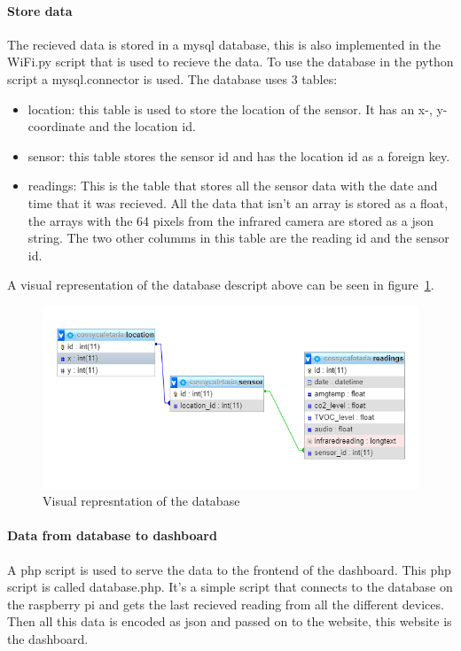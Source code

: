 \documentclass[11pt,a4paper]{article}
\begin{document}
\paragraph{Store data}
The recieved data is stored in a mysql database, this is also implemented in the WiFi.py script that is used to recieve the data.
To use the database in the python script a mysql.connector is used.
The database uses 3 tables: 
\begin{itemize}
	\item location: this table is used to store the location of the sensor. It has an x-, y-coordinate and the location id.
	\item sensor: this table stores the sensor id  and has the location id as a foreign key.
	\item readings: This is the table that stores all the sensor data with the date and time that it was recieved. 
					All the data that isn't an array is stored as a float, the arrays with the 64 pixels from the infrared camera are stored as a json string.
					The two other columms in this table are the reading id and the sensor id.  
\end{itemize}
A visual representation of the database descript above can be seen in figure~\ref{fig:db_des}.

\begin{figure}[H]
	\centering
	\includegraphics[width=1.0\linewidth]{databaseDesign.png}
	\caption{Visual represntation of the database}
	\label{fig:db_des}
\end{figure}

\paragraph{Data from database to dashboard}
A php script is used to serve the data to the frontend of the dashboard. This php script is called database.php. 
It's a simple script that connects to the database on the raspberry pi and gets the last recieved reading from all the different devices.
Then all this data is encoded as json and passed on to the website, this website is the dashboard. 
\end{document}
